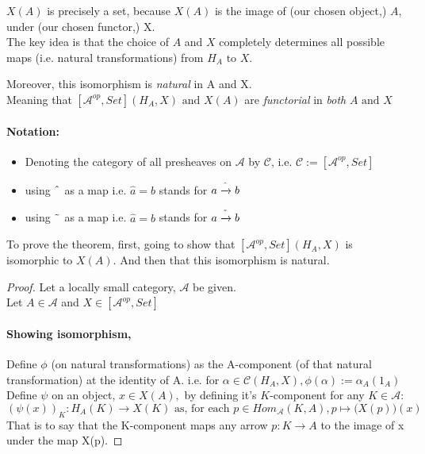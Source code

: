 \documentclass[18pt,a4paper]{extarticle}
\theoremstyle{theorem}
\theoremstyle{definition}
\theoremstyle{lemma}
\begin{document}
$X(A)$ is precisely a set, because $X(A)$ is the image of (our chosen object,) $A$, under (our chosen functor,) X. \\

The key idea is that the choice of $A$ and $X$ completely determines all possible maps
(i.e. natural transformations) from $H_A \text{ to } X$.

Moreover, this isomorphism is \textit{natural} in A and X. \\
Meaning that $[ \mathcal{A}^{op},Set](H_A,X) \text{ and } X(A)$ are
\textit{functorial} in \textit{both} $A \text{ and } X$

\paragraph{Notation:} \begin{itemize}
\item Denoting the category of all presheaves on $\mathcal{A} $ by $\mathcal{C}$,
	i.e. $\mathcal{C}:=[ \mathcal{A} ^{op}, Set] $
\item using $\string ^ $ as a map i.e. $\hat a = b$ stands for $a \xrightarrow{\string ^} b$
\item using $\string ~ $ as a map i.e. $\hat a = b$ stands for $a \xrightarrow{\string ~} b$
\end{itemize}

To prove the theorem, first,
going to show that $[ \mathcal{A} ^{op}, Set](H_A,X)$ is isomorphic to $X(A)$. And then that
this isomorphism is natural.

\begin{proof}Let a locally small category,  $\mathcal{A} $ be given. \\
	Let $A \in \mathcal{A} $ and $X \in [ \mathcal{A} ^{op}, Set]$\\

	\paragraph{Showing isomorphism,}


	Define $\phi$ (on natural transformations) as the A-component (of that natural transformation)
	at the identity of A. i.e. for $\alpha \in \mathcal{C}(H_A,X) ,
	\phi(\alpha):= \alpha_A(1_A) $ \\

	Define $\psi$ on an object, $ x \in X(A), $
	by defining it's $K$-component for any $K \in \mathcal{A} $:
	\[({\psi(x)})_K : H_A(K) \to X(K)
	\text{ as, for each } p\in Hom_{\mathcal{A} }(K,A), p \mapsto \Big(X(p)\Big)(x) \]
	That is to say that the K-component maps any arrow $p:K \to A$
	to the image of x under the map X(p).

\end{proof}
\end{document}

